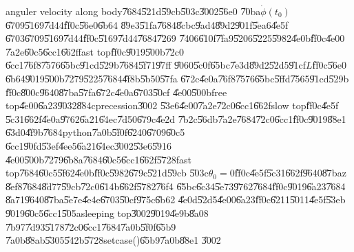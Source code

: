 anguler velocity along body\U{7684}\U{521d}\U{59cb}\U{503c}\U{3002}\U{56e0}%
\U{70ba}$\dot{\phi}(t_{0})$\U{6709}\U{5169}\U{7d44}\U{ff0c}\U{56e0}\U{6b64}%
\U{89e3}\U{51fa}\U{7684}\U{8cbc}\U{9ad4}\U{89d2}\U{901f}\U{5ea6}\U{4e5f}%
\U{6703}\U{6709}\U{5169}\U{7d44}\U{ff0c}\U{5169}\U{7d44}\U{7684}\U{7269}%
\U{7406}\U{610f}\U{7fa9}\U{5206}\U{5225}\U{5982}\U{4e0b}\U{ff0c}\U{4e00}%
\U{7a2e}\U{60c5}\U{6cc1}\U{662f}fast top\U{ff0c}\U{9019}\U{500b}\U{72c0}%
\U{6cc1}\U{76f8}\U{7576}\U{65bc}\U{91cd}\U{529b}\U{7684}\U{5f71}\U{97ff}%
\U{9060}\U{5c0f}\U{65bc}\U{7e3d}\U{89d2}\U{52d5}\U{91cf}$L$\U{ff0c}\U{56e0}%
\U{6b64}\U{9019}\U{500b}\U{7279}\U{5225}\U{7684}\U{4f8b}\U{5b50}\U{57fa}%
\U{672c}\U{4e0a}\U{76f8}\U{7576}\U{65bc}\U{5ffd}\U{7565}\U{91cd}\U{529b}%
\U{ff0c}\U{800c}\U{9640}\U{87ba}\U{57fa}\U{672c}\U{4e0a}\U{6703}\U{50cf}%
\U{4e00}\U{500b}free top\U{4e00}\U{6a23}\U{9032}\U{884c}precession\U{3002}%
\U{53e6}\U{4e00}\U{7a2e}\U{72c0}\U{6cc1}\U{662f}slow top\U{ff0c}\U{4e5f}%
\U{5c31}\U{662f}\U{4e0a}\U{9762}\U{6a21}\U{64ec}\U{7d50}\U{679c}\U{4e2d}%
\U{7b2c}\U{56db}\U{7a2e}\U{7684}\U{72c0}\U{6cc1}\U{ff0c}\U{9019}\U{88e1}%
\U{63d0}\U{4f9b}\U{7684}python\U{7a0b}\U{5f0f}\U{6240}\U{6709}\U{60c5}%
\U{6cc1}\U{90fd}\U{53ef}\U{4ee5}\U{6a21}\U{64ec}\U{3002}\U{53e6}\U{5916}%
\U{4e00}\U{500b}\U{7279}\U{6b8a}\U{7684}\U{60c5}\U{6cc1}\U{662f}\U{5728}fast
top\U{7684}\U{60c5}\U{5f62}\U{4e0b}\U{ff0c}\U{5982}\U{679c}\U{521d}\U{59cb}%
\U{503c}$\theta _{0}=0$\U{ff0c}\U{4e5f}\U{5c31}\U{662f}\U{9640}\U{87ba}z%
\U{8ef8}\U{7684}\U{8d77}\U{59cb}\U{72c0}\U{614b}\U{662f}\U{5782}\U{76f4}%
\U{65bc}\U{6c34}\U{5e73}\U{9762}\U{7684}\U{ff0c}\U{9019}\U{6a23}\U{7684}%
\U{8a71}\U{9640}\U{87ba}\U{5e7e}\U{4e4e}\U{6703}\U{50cf}\U{975c}\U{6b62}%
\U{4e0d}\U{52d5}\U{4e00}\U{6a23}\U{ff0c}\U{6211}\U{5011}\U{4e5f}\U{53eb}%
\U{9019}\U{60c5}\U{6cc1}\U{505a}sleeping top\U{3002}\U{9019}\U{4e9b}\U{8a08}%
\U{7b97}\U{7d93}\U{5178}\U{72c0}\U{6cc1}\U{7684}\U{7a0b}\U{5f0f}\U{65b9}%
\U{7a0b}\U{88ab}\U{5305}\U{542b}\U{5728}setcase()\U{65b9}\U{7a0b}\U{88e1}%
\U{3002}

\setcounter{page}{1}

